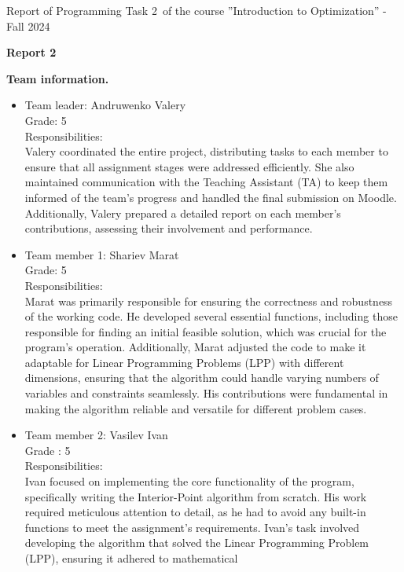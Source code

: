 \documentclass[12pt, legalpaper]{exam}
\newcommand{\course}{Introduction to Optimization}
\newcommand{\term}{Fall 2024}
\newcommand{\examnum}{Report of Programming Task 2}
\begin{document}
\noindent \examnum \, of the  course ''\course'' - \term


\noindent
{}




\vspace{12pt}
\begin{center}
    \textbf{Report 2}
\end{center}

\vspace{12pt}

\noindent  \textbf{Team information.}

\begin{itemize}
    \item Team leader: Andruwenko Valery 
    \\Grade: 5
    \\ Responsibilities:
    \\Valery coordinated the entire project, distributing tasks to each member to ensure that all assignment stages were addressed efficiently. She also maintained communication with the Teaching Assistant (TA) to keep them informed of the team’s progress and handled the final submission on Moodle. Additionally, Valery prepared a detailed report on each member's contributions, assessing their involvement and performance.
    \item Team member 1: Shariev Marat 
    \\ Grade: 5
    \\Responsibilities:
    \\Marat was primarily responsible for ensuring the correctness and robustness of the working code. He developed several essential functions, including those responsible for finding an initial feasible solution, which was crucial for the program’s operation. Additionally, Marat adjusted the code to make it adaptable for Linear Programming Problems (LPP) with different dimensions, ensuring that the algorithm could handle varying numbers of variables and constraints seamlessly. His contributions were fundamental in making the algorithm reliable and versatile for different problem cases.

    \item Team member 2: Vasilev Ivan
    \\ Grade : 5
    \\Responsibilities:
    \\Ivan focused on implementing the core functionality of the program, specifically writing the Interior-Point algorithm from scratch. His work required meticulous attention to detail, as he had to avoid any built-in functions to meet the assignment’s requirements. Ivan’s task involved developing the algorithm that solved the Linear Programming Problem (LPP), ensuring it adhered to mathematical 


\end{itemize}
\end{document}

